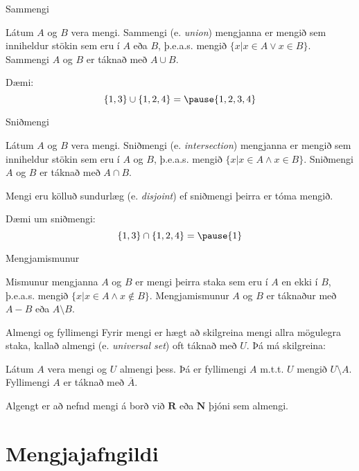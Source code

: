 \documentclass{beamer}
\begin{document}
\begin{frame}{Sammengi}
\begin{tcolorbox}[title=Sammengi]
Látum $A$ og $B$ vera mengi. 
Sammengi (e. \emph{union}) mengjanna er mengið sem inniheldur stökin sem eru í $A$ eða $B$, 
þ.e.a.s. mengið $\{x | x \in A \lor x \in B \}$. 
Sammengi $A$ og $B$ er táknað með $A\cup B$.
\end{tcolorbox}
Dæmi:
\[
 \{1, 3\} \cup \{1, 2, 4\} = \pause \{1, 2, 3, 4\}
\]
\end{frame}

\begin{frame}{Sniðmengi}
\begin{tcolorbox}[title=Sniðmengi]
Látum $A$ og $B$ vera mengi.
Sniðmengi (e. \emph{intersection}) mengjanna er mengið sem inniheldur stökin sem eru í $A$ og $B$, 
þ.e.a.s. mengið $\{x | x \in A \land x \in B \}$. 
Sniðmengi $A$ og $B$ er táknað með $A\cap B$.
\end{tcolorbox}
Mengi eru kölluð sundurlæg (e. \emph{disjoint}) ef sniðmengi þeirra er tóma mengið.

Dæmi um sniðmengi:
\[
 \{1, 3\} \cap \{1, 2, 4\} = \pause \{1\}
\]
\end{frame}

\begin{frame}{Mengjamismunur}
\begin{tcolorbox}[title=Mengjamismunur]
Mismunur mengjanna $A$ og $B$ er mengi þeirra staka sem eru í $A$ en ekki í $B$, þ.e.a.s. mengið $\{x | x \in A \land x \notin B\}$.
Mengjamismunur $A$ og $B$ er táknaður með $A - B$ eða $A \setminus B$.
\end{tcolorbox}
\end{frame}

\begin{frame}{Almengi og fyllimengi}
Fyrir mengi er hægt að skilgreina mengi allra mögulegra staka, kallað almengi (e. \emph{universal set}) oft táknað með $U$. Þá má skilgreina:

\begin{tcolorbox}[title=Fyllimengi]
Látum $A$ vera mengi og $U$ almengi þess. Þá er fyllimengi $A$ m.t.t. $U$ mengið $U \setminus A$. Fyllimengi $A$ er táknað með $\overline{A}$.
\end{tcolorbox}

Algengt er að nefnd mengi á borð við $\mathbf{R}$ eða $\mathbf{N}$ þjóni sem almengi.
\end{frame}

\section{Mengjajafngildi}
\end{document}

